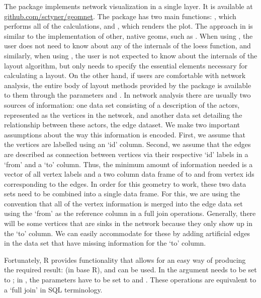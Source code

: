 The package  implements network visualization in a single  layer. It is available at \url{github.com/sctyner/geomnet}. The package has two main functions:  , which performs all of the calculations, and , which renders the plot.
The approach in  is similar to the implementation of other, native  geoms, such as . When using , the user does not need to know about any of the internals of the loess function, and similarly, when using , the user is not expected to know about the internals of the layout algorithm, but only needs to specify the essential elements necessary for calculating a layout. On the other hand, if users are comfortable with network analysis, the entire body of layout methods provided by the  package is available to them through the parameters  and .
%
In network analysis there are usually two sources of information: one data set consisting of a description of the actors, represented as the vertices in the network, and another data set detailing the relationship between these actors, the edge dataset. We make two important assumptions about the way this information is encoded. First, we assume that the vertices are labelled using an `id' column. Second, we assume that the edges are described as connection between vertices via their respective `id' labels in a `from' and a `to' column. Thus, the minimum amount of information needed is a vector of all vertex labels and a two column data frame of to and from vertex ids corresponding to the edges.  In order for this geometry to work, these two data sets need to be combined into a single data frame. For this, we are using the convention that all of the vertex information is merged into the edge data set using the `from' as the reference column in a full join operations. Generally, there will be some vertices that are sinks in the network because they only show up in the `to' column. We can easily accommodate for these by adding artificial edges in the data set that have missing information for the `to' column.

Fortunately, R provides functionality that allows for an easy way of producing the required result:  (in base R),  \citep[in  see][]{plyr} and  \citep[in , see][]{dplyr} can be used. In  the argument  needs to be set to ; in , the parameters have to be set to  and . These operations are equivalent to a `full join' in SQL terminology.


